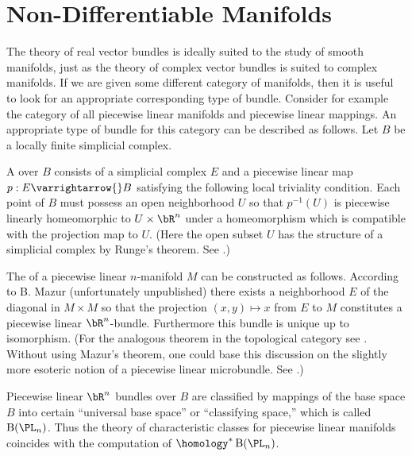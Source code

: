 \documentclass[../main]{subfiles}
\begin{document}
\section{Non-Differentiable Manifolds}
The theory of real vector bundles is ideally suited to the study of smooth manifolds, just as the theory of complex vector bundles is suited to complex manifolds. If we are given some different category of manifolds, then it is useful to look for an appropriate corresponding type of bundle. Consider for example the category of all piecewise linear manifolds and piecewise linear mappings. An appropriate type of bundle for this category can be described as follows. Let $B$ be a locally finite simplicial complex.

\begin{definition}
A  over $B$ consists of a simplicial complex $E$ and a piecewise linear map $p:E \varrightarrow{} B$ satisfying the following local triviality condition. Each point of $B$ must possess an open neighborhood $U$ so that $p^{-1}(U)$ is piecewise linearly homeomorphic to $U \times \bR^n$ under a homeomorphism which is compatible with the projection map to $U$. (Here the open subset $U$ has the structure of a simplicial complex by Runge's theorem. See \cite{alexandroff}.)
\end{definition}

The  of a piecewise linear $n$-manifold $M$ can be constructed as follows. According to B. Mazur (unfortunately unpublished) there exists a neighborhood $E$ of the diagonal in $M \times M$ so that the projection $(x,y) \mapsto x$ from $E$ to $M$ constitutes a piecewise linear $\bR^n$-bundle. Furthermore this bundle is unique up to isomorphism. (For the analogous theorem in the topological category see \cite{kirster}. Without using Mazur's theorem, one could base this discussion on the slightly more esoteric notion of a piecewise linear microbundle. See \cite{milnor1965}.)

Piecewise linear $\bR^n$ bundles over $B$ are classified by mappings of the base space $B$ into certain ``universal base space'' or ``classifying space,'' which is called $\operatorname{B}(\PL_n)$. Thus the theory of characteristic classes for piecewise linear manifolds coincides with the computation of $\homology^\ast \operatorname{B}(\PL_n)$.
\end{document}
